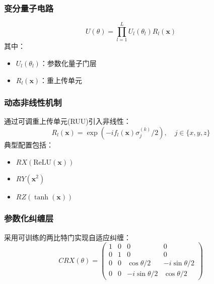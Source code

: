 \documentclass[10pt,a4paper,twoside]{article}
\numberwithin{figure}{section}%
\numberwithin{table}{section}%
\begin{document}
\subsubsection{变分量子电路}
\begin{equation}
U(\theta) = \prod_{l=1}^L U_l(\theta_l)R_l(\mathbf{x})
\end{equation}
其中：
\begin{itemize}
\item $U_l(\theta_l)$：参数化量子门层
\item $R_l(\mathbf{x})$：重上传单元
\end{itemize}

\subsubsection{动态非线性机制}
通过可调重上传单元(RUU)引入非线性：
\begin{equation}
R_l(\mathbf{x}) = \exp\left(-i f_l(\mathbf{x}) \sigma_j^{(k)}/2\right), \quad j \in \{x,y,z\}
\end{equation}
典型配置包括：
\begin{itemize}
\item $RX(\text{ReLU}(\mathbf{x}))$
\item $RY(\mathbf{x}^2)$
\item $RZ(\tanh(\mathbf{x}))$
\end{itemize}


\subsubsection{参数化纠缠层}
采用可训练的两比特门实现自适应纠缠：
\begin{equation}
CRX(\theta) = \begin{pmatrix}
1 & 0 & 0 & 0 \\
0 & 1 & 0 & 0 \\
0 & 0 & \cos\theta/2 & -i\sin\theta/2 \\
0 & 0 & -i\sin\theta/2 & \cos\theta/2 
\end{pmatrix}
\end{equation}
\end{document}
